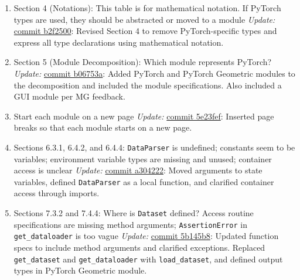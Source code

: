 \documentclass{article}
\begin{document}
\begin{enumerate}
    \item Section 4 (Notations): This table is for mathematical notation. If PyTorch types are used, they should be abstracted or moved to a module  
    \newline \textit{Update:} \href{https://github.com/Yuanqi-X/Re-ProtGNN/commit/b2f2500c3f98faf1ccdafe4afd0e4a062896c02d}{commit b2f2500}: Revised Section 4 to remove PyTorch-specific types and express all type declarations using mathematical notation.

    \item Section 5 (Module Decomposition): Which module represents PyTorch?  
    \newline \textit{Update:} \href{https://github.com/Yuanqi-X/Re-ProtGNN/commit/b06753aafd3dde80b4ffe4beaeaf41ffb161120a}{commit b06753a}: Added PyTorch and PyTorch Geometric modules to the decomposition and included the module specifications. Also included a GUI module per MG feedback.

    \item Start each module on a new page  
    \newline \textit{Update:} \href{https://github.com/Yuanqi-X/Re-ProtGNN/commit/5e23feffca74ad83f935c1705ff5e9fdce232425}{commit 5e23fef}: Inserted page breaks so that each module starts on a new page.

    \item Sections 6.3.1, 6.4.2, and 6.4.4: \texttt{DataParser} is undefined; constants seem to be variables; environment variable types are missing and unused; container access is unclear  
    \newline \textit{Update:} \href{https://github.com/Yuanqi-X/Re-ProtGNN/commit/a30422228d2ac8ab6f4aff34b6097ac21b956d8d}{commit a304222}: Moved arguments to state variables, defined \texttt{DataParser} as a local function, and clarified container access through imports.

    \item Sections 7.3.2 and 7.4.4: Where is \texttt{Dataset} defined? Access routine specifications are missing method arguments; \texttt{AssertionError} in \texttt{get\_dataloader} is too vague  
    \newline \textit{Update:} \href{https://github.com/Yuanqi-X/Re-ProtGNN/commit/5b145b8a603e2295f37efa2c691ab6068a97f44f}{commit 5b145b8}: Updated function specs to include method arguments and clarified exceptions. Replaced \texttt{get\_dataset} and \texttt{get\_dataloader} with \texttt{load\_dataset}, and defined output types in PyTorch Geometric module.


\end{enumerate}
\end{document}
